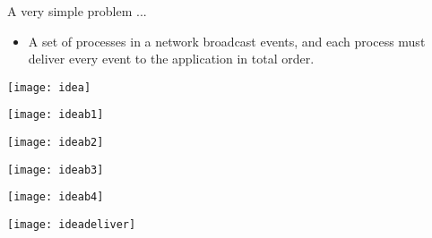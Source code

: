 \begin{frame}{A very simple problem ...}
  
  \begin{itemize}
  \item A set of processes in a network broadcast events, and each process must deliver every event to the application in total order.
  \end{itemize}

\centering


{
\texttt{[image: idea]}
}

{
\texttt{[image: ideab1]}
}

{
\texttt{[image: ideab2]}
}

{
\texttt{[image: ideab3]}
}

{
\texttt{[image: ideab4]}
}

{
\texttt{[image: ideadeliver]}
}


\end{frame}


